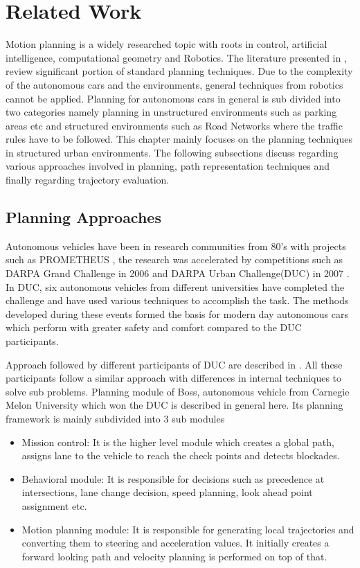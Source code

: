 \chapter{Related Work}
\label{related_work}
Motion planning is a widely researched topic with roots in control, artificial intelligence, computational geometry and Robotics. The literature presented in \cite{book_robot_motion_planning}, \cite{book_lavelle_planning} review significant portion of standard planning techniques. Due to the complexity of the autonomous cars and the environments, general techniques from robotics cannot be applied. Planning for autonomous cars in general is sub divided into two categories namely planning in unstructured environments such as parking areas etc and structured environments such as Road Networks where the traffic rules have to be followed. This chapter mainly focuses on the planning techniques in structured urban environments. The following subsections discuss regarding various approaches involved in planning, path representation techniques and finally regarding trajectory evaluation. 

\section{Planning Approaches}
\label{planning_aproaches}

Autonomous vehicles have been in research communities from 80's with projects such as PROMETHEUS \cite{prometheus}, the research was accelerated by competitions such as DARPA Grand Challenge in 2006 and DARPA Urban Challenge(DUC) in 2007 \cite{darpa_urban_challenge}. In DUC, six autonomous vehicles from different universities have completed the challenge and have used various techniques to accomplish the task. The methods developed during these events formed the basis for modern day autonomous cars which perform with greater safety and comfort compared to the DUC participants. 

Approach followed by different participants of DUC are described in \cite{darpa_urban_challenge}. All these participants follow a similar approach with differences in internal techniques to solve sub problems. Planning module of Boss, autonomous vehicle from Carnegie Melon University which won the DUC is described in general here. Its planning framework is mainly subdivided into 3 sub modules 

\begin{itemize}
	\item Mission control: It is the higher level module which creates a global path, assigns lane to the vehicle to reach the check points and detects blockades.
	\item Behavioral module: It is responsible for decisions such as precedence at intersections, lane change decision, speed planning, look ahead point assignment etc. 
	\item Motion planning module: It is responsible for generating local trajectories and converting them to steering and acceleration values. It initially creates a forward looking path and velocity planning is performed on top of that. 
\end{itemize}

